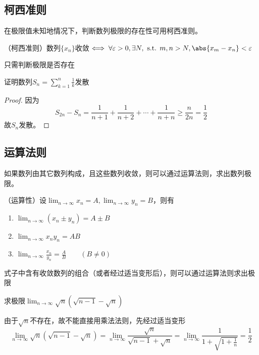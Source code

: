 \pagebreak
\subsection{柯西准则}
在极限值未知地情况下，判断数列极限的存在性可用柯西准则。
\begin{theorem}
    \label{th:柯西准则}
    （柯西准则）数列$\{x_n\}$收敛$\iff  \forall\varepsilon>0,\exists N,\text{ s.t. }m,n>N, \abs{x_m-x_n} <\varepsilon$
\end{theorem}
\begin{situation}
    只需判断极限是否存在
\end{situation}
\begin{example}
    证明数列$S_n=\sum_{k=1}^n \frac{1}{k}$发散
\end{example}
\begin{proof}
    因为
    \[ S_{2n} - S_{n} = \frac{1}{n+1}+\frac{1}{n+2}+\cdots+\frac{1}{n+n} \geq \frac{n}{2n} = \frac{1}{2}\]
    故${S_n}$发散。
\end{proof}

\subsection{运算法则}
如果数列由其它数列构成，且这些数列收敛，则可以通过运算法则，求出数列极限。
\begin{theorem}
    \label{th:数列极限运算法则}
    （运算性）设$\lim_{n\to\infty}x_n=A,\lim_{n\to\infty}y_n=B$，则有
    \begin{enumerate}
        \item $\lim_{n\to\infty} (x_n\pm y_n)=A\pm B$
        \item $\lim_{n\to\infty} x_ny_n=AB$
        \item $\lim_{n\to\infty} \frac{x_n}{y_n} = \frac{A}{B} \qquad (B\neq 0)$
    \end{enumerate}
\end{theorem}
\begin{situation}
    式子中含有收敛数列的组合（或者经过适当变形后），则可以通过运算法则求出极限
\end{situation}
\begin{example}
    求极限$\lim_{n\to\infty}\sqrt{n}(\sqrt{n-1}-\sqrt{n})$
\end{example}
\begin{solution}
    由于$\sqrt{n}$不存在，故不能直接用乘法法则，先经过适当变形
    \[
        \lim_{n\to\infty}   \sqrt{n}(\sqrt{n-1}-\sqrt{n})
        = \lim_{n\to\infty} \frac{\sqrt{n}}{\sqrt{n-1}+\sqrt{n}}
        = \lim_{n\to\infty} \frac{1}{1+\sqrt{1+\frac{1}{n}}}
        =\frac{1}{2}
    \]
\end{solution}

